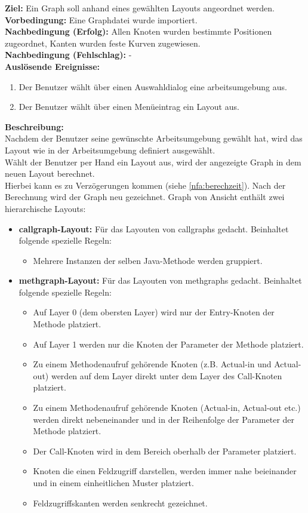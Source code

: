 \label{fa:layout}
\textbf{Ziel:} Ein Graph soll anhand eines gewählten Layouts angeordnet werden.\\
\textbf{Vorbedingung:} Eine Graphdatei wurde importiert.\\
\textbf{Nachbedingung (Erfolg):} Allen Knoten wurden bestimmte Positionen zugeordnet, Kanten wurden feste Kurven zugewiesen.\\
\textbf{Nachbedingung (Fehlschlag):} -\\
\textbf{Auslösende Ereignisse:}
\begin{enumerate}[nolistsep, label=(\alph*)]
	\item Der Benutzer wählt über einen Auswahldialog eine \gls{arbeitsumgebung} aus.
	\item Der Benutzer wählt über einen Menüeintrag ein Layout aus.
\end{enumerate}
\textbf{Beschreibung:}\\
Nachdem der Benutzer seine gewünschte Arbeitsumgebung gewählt hat, wird das Layout wie in der Arbeitsumgebung definiert ausgewählt.\\
Wählt der Benutzer per Hand ein Layout aus, wird der angezeigte Graph in dem neuen Layout berechnet.\\
Hierbei kann es zu Verzögerungen kommen (siehe \ref{nfa:berechzeit}).
Nach der Berechnung wird der Graph neu gezeichnet.
Graph von Ansicht enthält zwei hierarchische Layouts:
\begin{itemize}
  \item \textbf{\gls{callgraph}-Layout:} Für das Layouten von \glspl{callgraph} gedacht. Beinhaltet folgende spezielle Regeln:
    \begin{itemize}
      \item Mehrere Instanzen der selben Java-Methode werden gruppiert.
    \end{itemize}
  \item \textbf{\gls{methgraph}-Layout:} Für das Layouten von \glspl{methgraph} gedacht. Beinhaltet folgende spezielle Regeln:
    \begin{itemize}
      \item Auf Layer 0 (dem obersten Layer) wird nur der Entry-Knoten der Methode platziert.
      \item Auf Layer 1 werden nur die Knoten der Parameter der Methode platziert.
      \item Zu einem Methodenaufruf gehörende Knoten (z.B. Actual-in und Actual-out) werden auf dem Layer direkt unter dem Layer des Call-Knoten platziert.
      \item Zu einem Methodenaufruf gehörende Knoten (Actual-in, Actual-out etc.) werden direkt nebeneinander und in der Reihenfolge der Parameter der Methode platziert.
      \item Der Call-Knoten wird in dem Bereich oberhalb der Parameter platziert.
      \item Knoten die einen Feldzugriff darstellen, werden immer nahe beieinander und in einem einheitlichen Muster platziert.
      \item Feldzugriffskanten werden senkrecht gezeichnet.
    \end{itemize}
\end{itemize}
